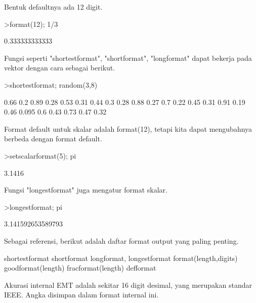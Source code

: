 \documentclass{article}
\begin{document}
\begin{eulernotebook}
\begin{eulercomment}
Bentuk defaultnya ada 12 digit.
\end{eulercomment}
\begin{eulerprompt}
>format(12); 1/3
\end{eulerprompt}
\begin{euleroutput}
  0.333333333333
\end{euleroutput}
\begin{eulercomment}
Fungsi seperti "shortestformat", "shortformat", "longformat" dapat
bekerja pada vektor dengan cara sebagai berikut.
\end{eulercomment}
\begin{eulerprompt}
>shortestformat; random(3,8)
\end{eulerprompt}
\begin{euleroutput}
    0.66    0.2   0.89   0.28   0.53   0.31   0.44    0.3 
    0.28   0.88   0.27    0.7   0.22   0.45   0.31   0.91 
    0.19   0.46  0.095    0.6   0.43   0.73   0.47   0.32 
\end{euleroutput}
\begin{eulercomment}
Format default untuk skalar adalah format(12), tetapi kita dapat
mengubahnya berbeda dengan format default.
\end{eulercomment}
\begin{eulerprompt}
>setscalarformat(5); pi
\end{eulerprompt}
\begin{euleroutput}
  3.1416
\end{euleroutput}
\begin{eulercomment}
Fungsi "longestformat" juga mengatur format skalar.
\end{eulercomment}
\begin{eulerprompt}
>longestformat; pi
\end{eulerprompt}
\begin{euleroutput}
  3.141592653589793
\end{euleroutput}
\begin{eulercomment}
Sebagai referensi, berikut adalah daftar format output yang paling
penting.

\end{eulercomment}
\begin{eulerttcomment}
 shortestformat shortformat longformat, longestformat
 format(length,digits) goodformat(length)
 fracformat(length)
 defformat
\end{eulerttcomment}
\begin{eulercomment}

Akurasi internal EMT adalah sekitar 16 digit desimal, yang merupakan
standar IEEE. Angka disimpan dalam format internal ini.


\end{eulercomment}
\end{eulernotebook}
\end{document}
